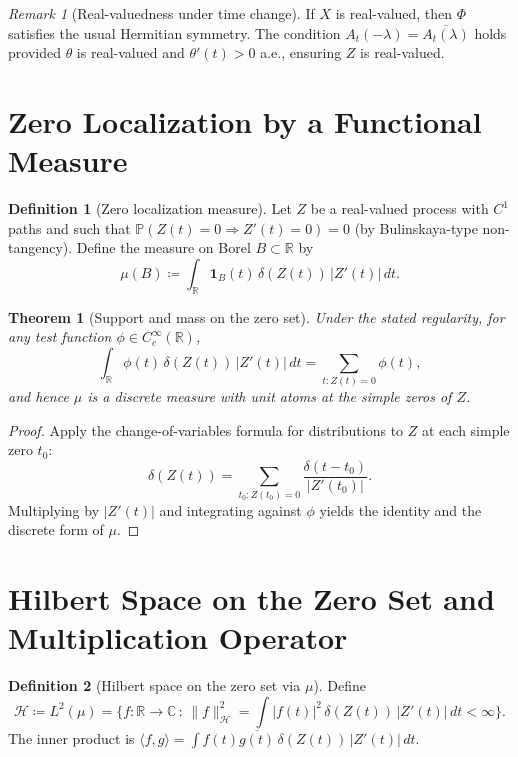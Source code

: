\documentclass[12pt]{article}
\newtheorem{theorem}{Theorem}
\theoremstyle{definition}
\newtheorem{definition}{Definition}
\theoremstyle{remark}
\newtheorem{remark}{Remark}
\begin{document}
\begin{remark}[Real-valuedness under time change]
If $X$ is real-valued, then $\Phi$ satisfies the usual Hermitian symmetry. The condition $A_t(-\lambda)=\overline{A_t(\lambda)}$ holds provided $\theta$ is real-valued and $\theta'(t)>0$ a.e., ensuring $Z$ is real-valued.
\end{remark}

\section{Zero Localization by a Functional Measure}

\begin{definition}[Zero localization measure]
Let $Z$ be a real-valued process with $C^1$ paths and such that $\mathbb{P}(Z(t)=0\Rightarrow Z'(t)=0)=0$ (by Bulinskaya-type non-tangency). Define the measure on Borel $B\subset\mathbb{R}$ by
\begin{equation}
  \mu(B)\coloneqq \int_{\mathbb{R}} \mathbf{1}_B(t)\,\delta(Z(t))\,|Z'(t)|\,dt.
\end{equation}
\end{definition}

\begin{theorem}[Support and mass on the zero set]
Under the stated regularity, for any test function $\phi\in C_c^\infty(\mathbb{R})$,
\begin{equation}
  \int_{\mathbb{R}} \phi(t)\,\delta(Z(t))\,|Z'(t)|\,dt
  = \sum_{t: Z(t)=0} \phi(t),
\end{equation}
and hence $\mu$ is a discrete measure with unit atoms at the simple zeros of $Z$.
\end{theorem}

\begin{proof}
Apply the change-of-variables formula for distributions to $Z$ at each simple zero $t_0$:
\[
\delta(Z(t))=\sum_{t_0: Z(t_0)=0}\frac{\delta(t-t_0)}{|Z'(t_0)|}.
\]
Multiplying by $|Z'(t)|$ and integrating against $\phi$ yields the identity and the discrete form of $\mu$.
\end{proof}

\section{Hilbert Space on the Zero Set and Multiplication Operator}

\begin{definition}[Hilbert space on the zero set via $\mu$]
Define
\[
\mathcal{H}\coloneqq L^2(\mu)
=\Big\{ f:\mathbb{R}\to\mathbb{C}\,:\, \|f\|_{\mathcal{H}}^2=\int |f(t)|^2\,\delta(Z(t))\,|Z'(t)|\,dt<\infty\Big\}.
\]
The inner product is $\langle f,g\rangle=\int f(t)\overline{g(t)}\,\delta(Z(t))\,|Z'(t)|\,dt$.
\end{definition}
\end{document}
